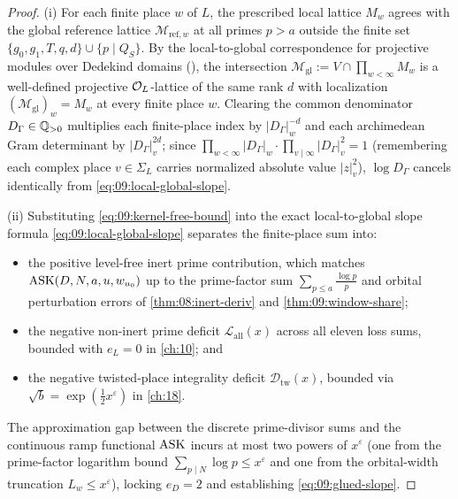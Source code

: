 \begin{proof}
(i) For each finite place $w$ of $L$, the prescribed local lattice $M_w$ agrees with the global reference lattice $\mathcal{M}_{\mathrm{ref}, w}$ at all primes $p > a$ outside the finite set $\{g_0, g_1, T, q, d\} \cup \{p \mid Q_S\}$. By the local-to-global correspondence for projective modules over Dedekind domains (), the intersection $\mathcal{M}_{\mathrm{gl}} := V \cap \prod_{w < \infty} M_w$ is a well-defined projective $\mathcal{O}_L$-lattice of the same rank $d$ with localization $(\mathcal{M}_{\mathrm{gl}})_w = M_w$ at every finite place $w$. Clearing the common denominator $D_\Gamma \in \mathbb{Q}_{>0}$ multiplies each finite-place index by $|D_\Gamma|_w^{-d}$ and each archimedean Gram determinant by $|D_\Gamma|_v^{2d}$; since $\prod_{w < \infty} |D_\Gamma|_w \cdot \prod_{v \mid \infty} |D_\Gamma|_v^2 = 1$ (remembering each complex place $v \in \Sigma_L$ carries normalized absolute value $|z|_v^2$), $\log D_\Gamma$ cancels identically from \eqref{eq:09:local-global-slope}.

(ii) Substituting \eqref{eq:09:kernel-free-bound} into the exact local-to-global slope formula \eqref{eq:09:local-global-slope} separates the finite-place sum into:
\begin{itemize}
\item the positive level-free inert prime contribution, which matches $\mathrm{ASK}(D, N, a, u, w_{u_0})$ up to the prime-factor sum $\sum_{p \le a} \frac{\log p}{p}$ and orbital perturbation errors of \cref{thm:08:inert-deriv} and \cref{thm:09:window-share};
\item the negative non-inert prime deficit $\mathcal{L}_{\mathrm{all}}(x)$ across all eleven loss sums, bounded with $e_L = 0$ in \cref{ch:10}; and
\item the negative twisted-place integrality deficit $\mathcal{D}_{\mathrm{tw}}(x)$, bounded via $\sqrt{b} = \exp(\frac{1}{2}x^\varepsilon)$ in \cref{ch:18}.
\end{itemize}
The approximation gap between the discrete prime-divisor sums and the continuous ramp functional $\mathrm{ASK}$ incurs at most two powers of $x^\varepsilon$ (one from the prime-factor logarithm bound $\sum_{p \mid N} \log p \le x^\varepsilon$ and one from the orbital-width truncation $L_w \le x^\varepsilon$), locking $e_D = 2$ and establishing \eqref{eq:09:glued-slope}.
\end{proof}

